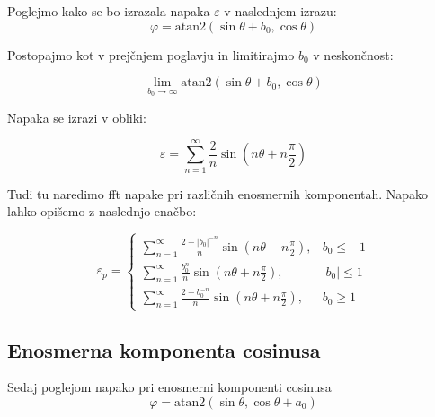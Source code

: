 Poglejmo kako se bo izrazala napaka $\varepsilon$ v naslednjem izrazu:
\begin{equation}
\varphi = \mathrm{atan2}(\sin{\theta} + b_0,\cos{\theta})
\end{equation}

Postopajmo kot v prejčnjem poglavju in limitirajmo $b_0$ v neskončnost:

\begin{equation}
\lim_{b_0 \rightarrow \infty} \mathrm{atan2}(\sin{\theta}+b_0,\cos{\theta})
\end{equation}


Napaka se izrazi v obliki:

\begin{equation}
\varepsilon = \sum_{n=1}^{\infty}\frac{2}{n} \sin (n \theta + n \frac{\pi}{2})
\end{equation}


Tudi tu naredimo fft napake pri različnih enosmernih komponentah. Napako lahko opišemo z naslednjo enačbo:

\begin{equation}
\label{vrsta_sinoff}
\varepsilon_p=
\begin{cases}
\sum_{n=1}^{\infty}\frac{2-|b_0|^{-n}}{n} \sin (n \theta - n \frac{\pi}{2}), & b_0\leq -1 \\
\sum_{n=1}^{\infty}\frac{b_0^n}{n} \sin (n \theta + n \frac{\pi}{2}), & |b_0|\leq 1 \\
\sum_{n=1}^{\infty}\frac{2-b_0^{-n}}{n} \sin (n \theta + n \frac{\pi}{2}), & b_0\geq 1
\end{cases}
\end{equation}





\subsection{Enosmerna komponenta cosinusa}

Sedaj poglejom napako pri enosmerni komponenti cosinusa
\begin{equation}
\varphi = \mathrm{atan2}(\sin{\theta},\cos{\theta} + a_0)
\end{equation}

